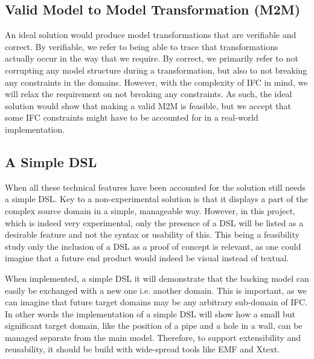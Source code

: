 
\subsection{Valid Model to Model Transformation (M2M)}
An ideal solution would produce model transformations that are verifiable and correct. By verifiable, we refer to being able to trace that transformations actually occur in the way that we require. By correct, we primarily refer to not corrupting any model structure during a transformation, but also to not breaking any constraints in the domains. However, with the complexity of IFC in mind, we will relax the requirement on not breaking any constraints. As such, the ideal solution would show that making a valid M2M is feasible, but we accept that some IFC constraints might have to be accounted for in a real-world implementation.

\subsection{A Simple DSL}
When all these technical features have been accounted for the solution still needs a simple DSL. Key to a non-experimental solution is that it displays a part of the complex source domain in a simple, manageable way. However, in this project, which is indeed very experimental, only the presence of a DSL will be listed as a desirable feature and not the syntax or usability of this. This being a feasibility study only the inclusion of a DSL as a proof of concept is relevant, as one could imagine that a future end product would indeed be visual instead of textual.

When implemented, a simple DSL it will demonstrate that the backing model can easily be exchanged with a new one i.e. another domain. This is important, as we can imagine that future target domains may be any arbitrary sub-domain of IFC. In other words the implementation of a simple DSL will show how a small but significant target domain, like the position of a pipe and a hole in a wall, can be managed separate from the main model. Therefore, to support extensibility and reusability, it should be build with wide-spread tools like EMF and Xtext.

